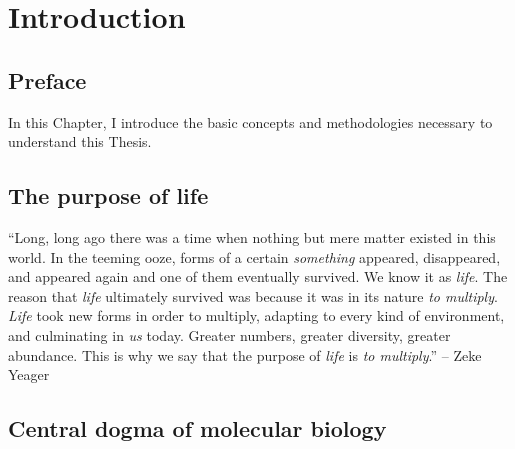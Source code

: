 \chapter{Introduction}

\section*{Preface}

In this Chapter, I introduce the basic concepts and methodologies necessary to understand this Thesis.

\section{The purpose of life}

``Long, long ago there was a time when nothing but mere matter existed in this world. In the teeming ooze, forms of a certain \textit{something} appeared, disappeared, and appeared again and one of them eventually survived. We know it as \textit{life}. The reason that \textit{life} ultimately survived was because it was in its nature \textit{to multiply}. \textit{Life} took new forms in order to multiply, adapting to every kind of environment, and culminating in \textit{us} today. Greater numbers, greater diversity, greater abundance. This is why we say that the purpose of \textit{life} is \textit{to multiply}.'' -- Zeke Yeager  \cite{ISAYAMA_2021}

\section{Central dogma of molecular biology}